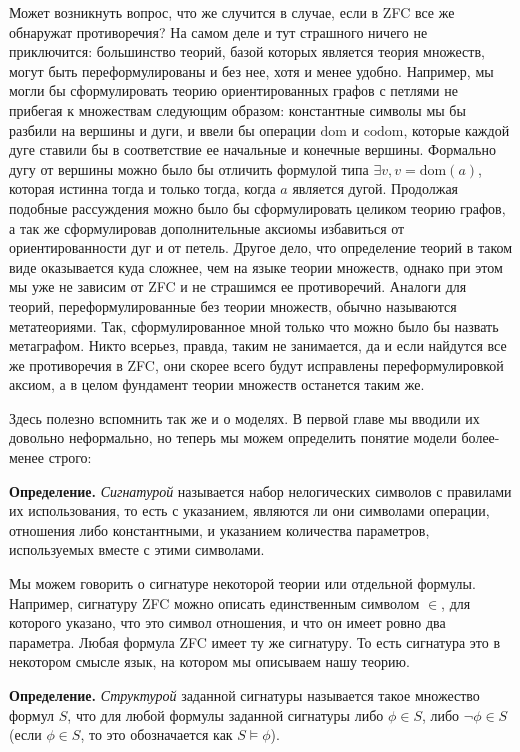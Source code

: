 Может возникнуть вопрос, что же случится в случае, если в ZFC все же обнаружат противоречия? На самом деле и тут страшного ничего не приключится: большинство теорий, базой которых является теория множеств, могут быть переформулированы и без нее, хотя и менее удобно. Например, мы могли бы сформулировать теорию ориентированных графов с петлями не прибегая к множествам следующим образом: константные символы мы бы разбили на вершины и дуги, и ввели бы операции $\mathrm{dom}$ и $\mathrm{codom}$, которые каждой дуге ставили бы в соответствие ее начальные и конечные вершины. Формально дугу от вершины можно было бы отличить формулой типа $\exists v, v=\mathrm{dom}(a)$, которая истинна тогда и только тогда, когда $a$ является дугой. Продолжая подобные рассуждения можно было бы сформулировать целиком теорию графов, а так же сформулировав дополнительные аксиомы избавиться от ориентированности дуг и от петель. Другое дело, что определение теорий в таком виде оказывается куда сложнее, чем на языке теории множеств, однако при этом мы уже не зависим от ZFC и не страшимся ее противоречий. Аналоги для теорий, переформулированные без теории множеств, обычно называются метатеориями. Так, сформулированное мной только что можно было бы назвать метаграфом. Никто всерьез, правда, таким не занимается, да и если найдутся все же противоречия в ZFC, они скорее всего будут исправлены переформулировкой аксиом, а в целом фундамент теории множеств останется таким же.

Здесь полезно вспомнить так же и о моделях. В первой главе мы вводили их довольно неформально, но теперь мы можем определить понятие модели более-менее строго:

{\bfseries Определение.} {\slshape Сигнатурой} называется набор нелогических символов с правилами их использования, то есть с указанием, являются ли они символами операции, отношения либо константными, и указанием количества параметров, используемых вместе с этими символами.

Мы можем говорить о сигнатуре некоторой теории или отдельной формулы. Например, сигнатуру ZFC можно описать единственным символом $\in$, для которого указано, что это символ отношения, и что он имеет ровно два параметра. Любая формула ZFC имеет ту же сигнатуру. То есть сигнатура это в некотором смысле язык, на котором мы описываем нашу теорию.

{\bfseries Определение.} {\slshape Структурой} заданной сигнатуры называется такое множество формул $S$, что для любой формулы заданной сигнатуры либо $\phi\in S$, либо $\neg\phi \in S$ (если $\phi\in S$, то это обозначается как $S\models\phi$).

